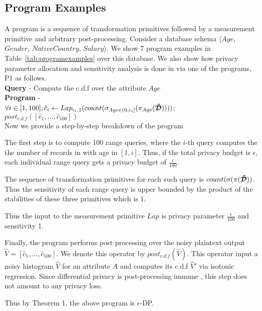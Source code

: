 \subsection{Program Examples}
A \system program is a sequence of transformation primitives followed by a measurement primitive and arbitrary post-processing. Consider a database schema $\langle Age$, $Gender$, $NativeCountry$, $Salary\rangle$. We show 7 \system program examples in Table~\ref{tab:programexamples} over this database.
We also show how privacy parameter allocation and sensitivity analysis is done in \system via one of the programs, P1 as follows. \\
\textbf{Query} - Compute the c.d.f over the attribute $Age$\\
\textbf{\system Program }- \\
$\forall i\in [1,100],\hat{c}_i \leftarrow Lap_{\epsilon_i,1}(count(\sigma_{Age \in (0, c_i]}(\pi_{Age}(\boldsymbol{\tilde{\mathcal{D}}}))))$;\\ $post_{c.d.f}([\hat{c}_1,\ldots,\hat{c}_{100}])$\\
Now we provide a step-by-step breakdown of the program
\squishlistnum \item The first step is to compute 100 range queries, where the $i$-th query computes the the number of records in with age in $[1,i]$. Thus, if the total privacy budget is $\epsilon$, each individual range query gets a privacy budget of $\frac{\epsilon}{100}$. 
\item  The sequence of transformation primitives for each such query is $count(\sigma(\pi(\boldsymbol{\tilde{\mathcal{D}}}))$. Thus the sensitivity of each range query is upper bounded by the product of the stabilities of these three primitives which is $1$. \item Thus the input to the measurement primitive $Lap$ is privacy parameter $\frac{\epsilon}{100}$ and sensitivity 1. \item Finally, the program performs post processing over the noisy plaintext output $\hat{V}=[\hat{c}_1,...,\hat{c}_{100}]$. We denote this operator by $post_{c.d.f}(\hat{V})$. This operator input a noisy histogram $\hat{V}$
for an attribute $A$ and computes its c.d.f $\hat{V}'$ via isotonic regression. Since differential privacy is post-processing immune \cite{Dork}, this step does not amount to any privacy loss.\item Thus by Theorem 1, the above program is $\epsilon$-DP. \squishendnum 
